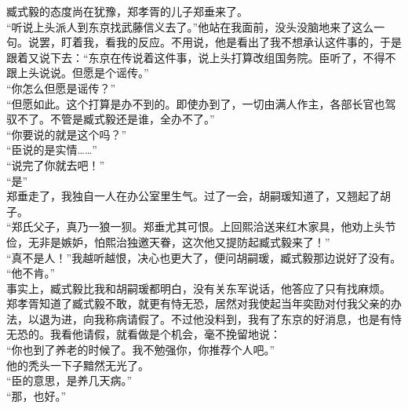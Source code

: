 臧式毅的态度尚在犹豫，郑孝胥的儿子郑垂来了。\\

“听说上头派人到东京找武藤信义去了。”他站在我面前，没头没脑地来了这么一句。说罢，盯着我，看我的反应。不用说，他是看出了我不想承认这件事的，于是跟着又说下去：“东京在传说着这件事，说上头打算改组国务院。臣听了，不得不跟上头说说。但愿是个谣传。”\\

“你怎么但愿是谣传？”\\

“但愿如此。这个打算是办不到的。即使办到了，一切由满人作主，各部长官也驾驭不了。不管是臧式毅还是谁，全办不了。”\\

“你要说的就是这个吗？”\\

“臣说的是实情……”\\

“说完了你就去吧！”\\

“是”\\

郑垂走了，我独自一人在办公室里生气。过了一会，胡嗣瑗知道了，又翘起了胡子。\\

“郑氏父子，真乃一狼一狈。郑垂尤其可恨。上回熙洽送来红木家具，他劝上头节俭，无非是嫉妒，怕熙治独邀天眷，这次他又提防起臧式毅来了！”\\

“真不是人！”我越听越恨，决心也更大了，便问胡嗣瑗，臧式毅那边说好了没有。\\

“他不肯。”\\

事实上，臧式毅比我和胡嗣瑗都明白，没有关东军说话，他答应了只有找麻烦。\\

郑孝胥知道了臧式毅不敢，就更有恃无恐，居然对我使起当年奕劻对付我父亲的办法，以退为进，向我称病请假了。不过他没料到，我有了东京的好消息，也是有恃无恐的。我看他请假，就看做是个机会，毫不挽留地说：\\

“你也到了养老的时候了。我不勉强你，你推荐个人吧。”\\

他的秃头一下子黯然无光了。\\

“臣的意思，是养几天病。”\\

“那，也好。”\\

